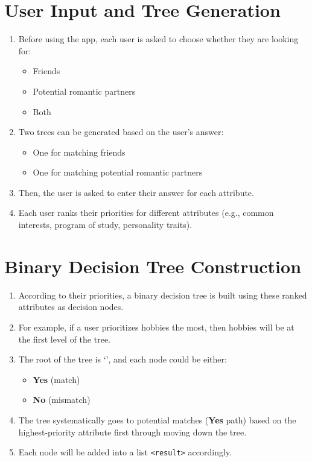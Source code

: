 \documentclass[fontsize=11pt]{article}
\begin{document}
\section{User Input and Tree Generation}
\begin{enumerate}
    \item Before using the app, each user is asked to choose whether they are looking for:
    \begin{itemize}
        \item Friends
        \item Potential romantic partners
        \item Both
    \end{itemize}
    \item Two trees can be generated based on the user’s answer:
    \begin{itemize}
        \item One for matching friends
        \item One for matching potential romantic partners
    \end{itemize}
    \item Then, the user is asked to enter their answer for each attribute.
    \item Each user ranks their priorities for different attributes (e.g., common interests, program of study, personality traits).
\end{enumerate}

\section{Binary Decision Tree Construction}
\begin{enumerate}
    \item According to their priorities, a binary decision tree is built using these ranked attributes as decision nodes.
    \item For example, if a user prioritizes hobbies the most, then hobbies will be at the first level of the tree.
    \item The root of the tree is ‘’, and each node could be either:
    \begin{itemize}
        \item \textbf{Yes} (match)
        \item \textbf{No} (mismatch)
    \end{itemize}
    \item The tree systematically goes to potential matches (\textbf{Yes} path) based on the highest-priority attribute first through moving down the tree.
    \item Each node will be added into a list \texttt{<result>} accordingly.
\end{enumerate}
\end{document}
